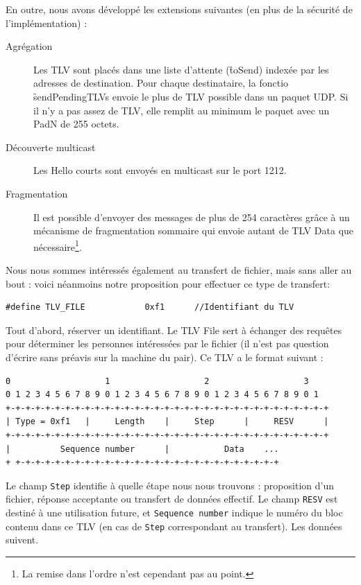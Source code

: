 \documentclass[11pt,a4paper]{article}
\begin{document}
En outre, nous avons développé les extensions suivantes (en plus de la sécurité de l'implémentation) :
\begin{description}
\item[Agrégation] Les TLV sont placés dans une liste d'attente (\f{toSend}) indexée par les adresses de destination. Pour chaque destinataire, la fonctio \f{sendPendingTLVs}
envoie le plus de TLV possible dans un paquet UDP. Si il n'y a pas assez de TLV, elle remplit au minimum le paquet avec un PadN de 255 octets.
\item[Découverte multicast]Les Hello courts sont envoyés en multicast sur le port 1212.

\item[Fragmentation] Il est possible d'envoyer des messages de plus de 254 caractères grâce à un mécanisme de fragmentation sommaire qui envoie autant de 
TLV Data que nécessaire\footnote{La remise dans l'ordre n'est cependant pas au point.}.
\end{description}

Nous nous sommes intéressés également au transfert de fichier, mais sans aller au bout : voici néanmoins notre proposition pour effectuer ce type de transfert:

\begin{lstlisting}
#define TLV_FILE			0xf1      //Identifiant du TLV
\end{lstlisting}

Tout d'abord, réserver un identifiant. Le TLV File sert à échanger des requêtes pour déterminer les personnes intéressées par le fichier (il n'est pas question
d'écrire sans préavis sur la machine du pair). Ce TLV a le format suivant :

\begin{verbatim}
0                   1                   2                   3
0 1 2 3 4 5 6 7 8 9 0 1 2 3 4 5 6 7 8 9 0 1 2 3 4 5 6 7 8 9 0 1
+-+-+-+-+-+-+-+-+-+-+-+-+-+-+-+-+-+-+-+-+-+-+-+-+-+-+-+-+-+-+-+-+
| Type = 0xf1   |     Length    |     Step      |     RESV      |
+-+-+-+-+-+-+-+-+-+-+-+-+-+-+-+-+-+-+-+-+-+-+-+-+-+-+-+-+-+-+-+-+
|          Sequence number      |           Data    ...	         
+ +-+-+-+-+-+-+-+-+-+-+-+-+-+-+-+-+-+-+-+-+-+-+-+-+-+-+
\end{verbatim}

Le champ \texttt{Step} identifie à quelle étape nous nous trouvons : proposition d'un fichier, réponse acceptante ou transfert
de données effectif. Le champ \texttt{RESV} est destiné à une
utilisation future, et \texttt{Sequence number} indique le numéro du bloc contenu dans ce TLV (en cas de \texttt{Step} correspondant au transfert).
Les données suivent.
\end{document}
